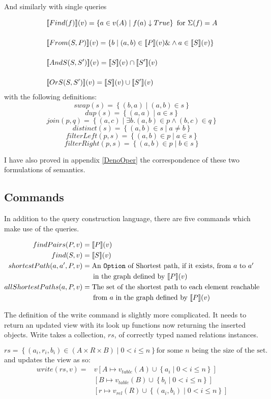 \documentclass[12pt,a4paper,twoside,openright]{report}
\newcommand\codeName[1]{\texttt{#1}}
\newcommand{\db}[1]{{\bf [\![}#1{\bf ]\!]}}
\newcommand{\deno}[1]{\db{#1}(v)}
\newcommand{\setComp}[2]{\left\lbrace #1 \mid #2 \right\rbrace}
\begin{document}
And similarly with single queries

\begin{align}
&\deno{Find(f)} = \setComp{a \in v(A)}{f(a)\downarrow True} \mbox{ for $\Sigma(f) = A$} \\[3ex]
&\deno{From(S, P)} =  \setComp{b}{(a, b) \in \deno{P} \&\wedge a \in \deno{S}}   \\[3ex]
&\deno{AndS(S, S')} = \deno{S} \cap \deno{S'} \\[3ex]
&\deno{OrS(S, S')} = \deno{S} \cup \deno{S'}
\end{align}
with the following definitions:
\[ swap(s) = \setComp{(b,a)}{(a, b) \in s}\]
\[ dup(s) = \setComp{(a,a)}{a \in s}\]
\[ join(p, q) = \setComp{(a, c)}{ \exists b. (a, b) \in p \wedge (b, c) \in q}\]
\[ distinct(s) = \setComp{(a, b) \in s} { a \neq b} \]
\[ filterLeft(p, s) = \setComp{(a, b) \in p}{a \in s}\]
\[ filterRight(p, s) = \setComp{(a, b) \in p}{b \in s}\]
    
   I have also proved in appendix \ref{DenoOper} the correspondence of these two formulations of semantics.
\subsection{Commands}
In addition to the query construction language, there are five commands which make use of the queries.

\[\label{CommandSemantics}
\begin{split}
findPairs(P, v) &= \deno{P}\\
find(S, v) &=  \deno{S}\\
shortestPath(a, a', P, v) &= \mbox{An \codeName{Option} of Shortest path, if it exists, from $a$ to $a'$}\\
& \indent \mbox{in the graph defined by $\deno{P}$}\\
allShortestPaths(a, P, v) &= \mbox{The set of the shortest path to each element reachable}\\
 & \indent \mbox{from $a$ in the graph defined by $\deno{P}$}\\
\end{split}\]

The definition of the write command is slightly more complicated. It needs to return an updated view with its look up functions now returning the inserted objects. Write takes a collection, $rs$, of correctly typed named relations instances.


\[rs = \setComp{(a_i, r_i, b_i) \in (A \times R \times B)}{0 < i \leqslant n} \mbox{for some $n$ being the size of the set.}\]
and updates the view as so: 
\begin{equation}
\begin{split}
write(rs, v) = &v\left[A \mapsto v_{table}(A) \cup \setComp{a_i}{0 < i \leqslant n}\right]\\
& \left[B \mapsto v_{table}(B) \cup \setComp{b_i}{0 < i \leqslant n}\right]\\
& \left[r \mapsto v_{rel}(R) \cup \setComp{(a_i, b_i)}{0 < i \leqslant n}\right] 
\end{split}
\end{equation}
\end{document}
